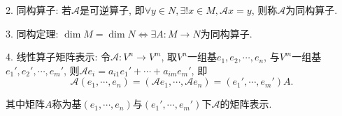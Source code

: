   2. 同构算子: 若$\mathscr{A}$是可逆算子, 即$\forall y \in N , \exists ! x\in M,\mathscr{A}x=y$, 则称$\mathscr{A}$为同构算子.
  
  3. 同构定理: $\dim M=\dim N \Leftrightarrow \exists A:M\rightarrow N$为同构算子.

  4. 线性算子矩阵表示: 令$\mathscr{A}: V^n \rightarrow V^m$, 取$V^n$一组基$e_1,e_2,\cdots,e_n$, 
  与$V^m$一组基$e_1',e_2',\cdots,e_m'$, 则$\mathscr{A} e_i=a_{i1}e_1'+\cdots+a_{im}e_m'$, 即
  \begin{equation*}
    \mathscr{A}(e_1,\cdots,e_n)=(\mathscr{A} e_1,\cdots,\mathscr{A} e_n)=(e_1',\cdots,e_m')A.
  \end{equation*}

  其中矩阵$A$称为基$(e_1,\cdots,e_n)$与$(e_1',\cdots,e_m')$下$\mathscr{A}$的矩阵表示.